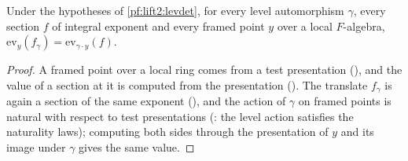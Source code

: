 \begin{lemma}\label{pf:lift2:evtransl}
Under the hypotheses of \cref{pf:lift2:levdet}, for every level automorphism $\gamma$, every section $f$ of integral exponent and
every framed point $y$ over a local $F$-algebra, $\mathrm{ev}_y(f_\gamma)=\mathrm{ev}_{\gamma\cdot y}(f)$.
\end{lemma}

\begin{proof}
A framed point over a local ring comes from a test presentation
(), and the value of a section at it is computed from the
presentation (). The translate $f_\gamma$ is again a section of the same exponent
(), and the action of $\gamma$ on framed points is natural with respect to
test presentations (: the level action satisfies the naturality
laws); computing both sides through the presentation of $y$ and its image under $\gamma$ gives the same value.
\end{proof}
